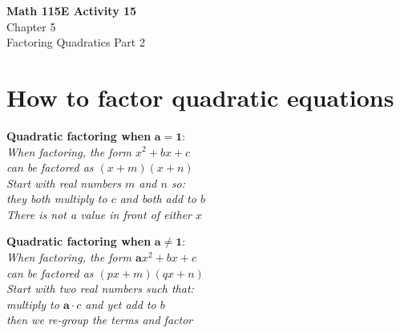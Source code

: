 \documentclass[12pt]{article}
\begin{document}
\begin{center}
    \Large \textbf{Math 115E Activity 15} \\
    \vspace{0.2cm}
    \normalsize Chapter 5 \\
    \normalsize Factoring Quadratics Part 2
\end{center}
\vspace{-0.5cm}
\noindent
\section*{How to factor quadratic equations}
\noindent
\begin{minipage}[t]{0.48\textwidth}
\begin{tcolorbox}[
    width=\linewidth,
    colframe=black,         %
    colback=white,          %
    boxrule=0.5pt,          %
    left=1mm, right=1.1mm,    %
    top=1mm, bottom=1mm,    %
    arc=2mm                 %
]
\textbf{Quadratic factoring when} $\mathbf{a = 1}$: \\ 
\textit{When factoring, the form $x^2 + bx + c$ \\
can be factored as $(x+m)(x+n)$\\
Start with real numbers $m$ and $n$ so: \\
they both multiply to $c$ and both add to $b$\\
There is not a value in front of either $x$}
\end{tcolorbox}
\end{minipage}%
\hfill
\begin{minipage}[t]{0.48\textwidth}
\begin{tcolorbox}[
    width=\linewidth,
    colframe=black,         %
    colback=white,          %
    boxrule=0.5pt,          %
    left=1mm, right=1.1mm,    %
    top=1mm, bottom=1mm,    %
    arc=2mm                 %
]
\textbf{Quadratic factoring when} $\mathbf{a \neq 1}$: \\ 
\textit{When factoring, the form $\boldsymbol{a}x^2 + bx + c$ \\
can be factored as $(px+m)(qx+n)$\\
Start with two real numbers such that: \\
multiply to $\boldsymbol{a} \cdot c$ and yet add to $b$ \\
then we re-group the terms and factor}
\end{tcolorbox}
\end{minipage}
\end{document}
